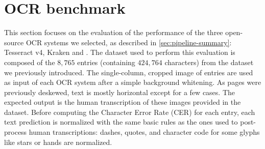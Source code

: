 \section{OCR benchmark}
\label{sec:ocr-xp}

This section focuses on the evaluation of the performance of the three open-source OCR systems we selected, as described in \cref{sec:pipeline-summary}: Tesseract v4, Kraken and \peroocr.
The dataset used to perform this evaluation is composed of the $8,765$ entries (containing $424,764$ characters) from the dataset we previously introduced.
The single-column, cropped image of entries are used as input of each OCR system after a simple background whitening.
As pages were previously deskewed, text is mostly horizontal except for a few cases.
The expected output is the human transcription of these images provided in the dataset.
Before computing the Character Error Rate (CER) for each entry, each text prediction is normalized with the same basic rules as the ones used to post-process human transcriptions: dashes, quotes, and character code for some glyphs like stars or hands are normalized.



